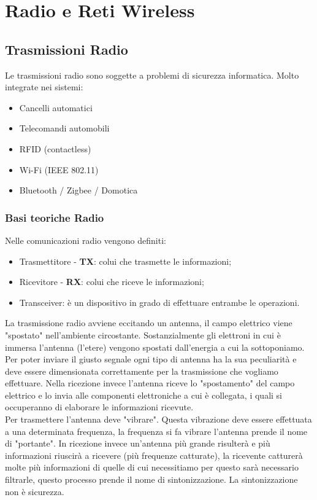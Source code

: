 \chapter{Radio e Reti Wireless}

\section{Trasmissioni Radio}
Le trasmissioni radio sono soggette a problemi di sicurezza informatica.
Molto integrate nei sistemi:
\begin{itemize}
    \item Cancelli automatici
    \item Telecomandi automobili
    \item RFID (contactless)
    \item Wi-Fi (IEEE 802.11)
    \item Bluetooth / Zigbee / Domotica
\end{itemize}
\subsection{Basi teoriche Radio}
Nelle comunicazioni radio vengono definiti:
\begin{itemize}
    \item Trasmettitore - \textbf{TX}: colui che trasmette le informazioni;
    \item Ricevitore - \textbf{RX}: colui che riceve le informazioni;
    \item Transceiver: è un dispositivo in grado di effettuare entrambe le operazioni.
\end{itemize}

La trasmissione radio avviene eccitando un antenna, il campo elettrico viene "spostato" nell'ambiente circostante. Sostanzialmente gli elettroni in cui è immersa l'antenna (l'etere) vengono spostati dall'energia a cui la sottoponiamo.
Per poter inviare il giusto segnale ogni tipo di antenna ha la sua peculiarità e deve essere dimensionata correttamente per la trasmissione che vogliamo effettuare.
Nella ricezione invece l'antenna riceve lo "spostamento" del campo elettrico e lo invia alle componenti elettroniche a cui è collegata, i quali si occuperanno di elaborare le informazioni ricevute.\\
Per trasmettere l'antenna deve "vibrare". Questa vibrazione deve essere effettuata a una determinata frequenza, la frequenza si fa vibrare l'antenna prende il nome di "portante".
In ricezione invece un'antenna più grande risulterà e più informazioni riuscirà a ricevere (più frequenze catturate), la ricevente catturerà molte più informazioni di quelle di cui necessitiamo per questo sarà necessario filtrarle, questo processo prende il nome di sintonizzazione. La sintonizzazione non è sicurezza.


